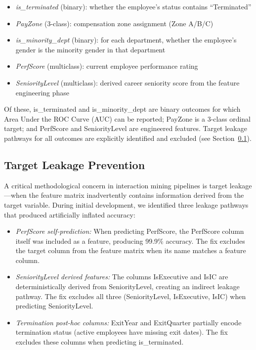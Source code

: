 \documentclass[conference]{IEEEtran}
\begin{document}
\begin{itemize}
    \item \textit{is\_terminated} (binary): whether the employee's status contains ``Terminated''
    \item \textit{PayZone} (3-class): compensation zone assignment (Zone A/B/C)
    \item \textit{is\_minority\_dept} (binary): for each department, whether the employee's gender is the minority gender in that department
    \item \textit{PerfScore} (multiclass): current employee performance rating
    \item \textit{SeniorityLevel} (multiclass): derived career seniority score from the feature engineering phase
\end{itemize}

Of these, is\_terminated and is\_minority\_dept are binary outcomes for which Area Under the ROC Curve (AUC) can be reported; PayZone is a 3-class ordinal target; and PerfScore and SeniorityLevel are engineered features. Target leakage pathways for all outcomes are explicitly identified and excluded (see Section~\ref{sec:leakage}).

\subsection{Target Leakage Prevention}
\label{sec:leakage}

A critical methodological concern in interaction mining pipelines is target leakage---when the feature matrix inadvertently contains information derived from the target variable. During initial development, we identified three leakage pathways that produced artificially inflated accuracy:

\begin{itemize}
    \item \textit{PerfScore self-prediction:} When predicting PerfScore, the PerfScore column itself was included as a feature, producing 99.9\% accuracy. The fix excludes the target column from the feature matrix when its name matches a feature column.
    \item \textit{SeniorityLevel derived features:} The columns IsExecutive and IsIC are deterministically derived from SeniorityLevel, creating an indirect leakage pathway. The fix excludes all three (SeniorityLevel, IsExecutive, IsIC) when predicting SeniorityLevel.
    \item \textit{Termination post-hoc columns:} ExitYear and ExitQuarter partially encode termination status (active employees have missing exit dates). The fix excludes these columns when predicting is\_terminated.
\end{itemize}
\end{document}
